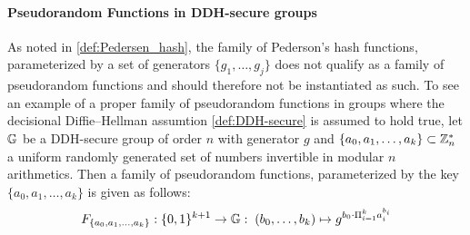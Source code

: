 \paragraph{Pseudorandom Functions in DDH-secure groups}
As noted in \ref{def:Pedersen_hash}, the family of Pederson's hash functions, parameterized by a set of generators $\{g_1,\ldots,g_j\}$ does not qualify as a family of pseudorandom functions and should therefore not be instantiated as such. To see an example of a proper family of pseudorandom functions in groups where the decisional Diffie--Hellman assumtion \ref{def:DDH-secure} is assumed to hold true, let $\mathbb{G}$ be a DDH-secure group of order $n$ with generator $g$ and $\{a_0,a_1,\ldots,a_k\}\subset \mathbb{Z}_{n}^*$ a uniform randomly generated set of numbers invertible in modular $n$ arithmetics. Then a family of pseudorandom functions, parameterized by the key $\{a_0,a_1,\ldots,a_k\}$ is given as follows:
\begin{equation}
F_{\{a_0,a_1,\ldots,a_k\}}: \{0,1\}^{k+1} \to \mathbb{G}:\; (b_0,\ldots,b_k)\mapsto g^{b_0\cdot \Pi_{i=1}^k a_i^{b_i}}
\end{equation}




